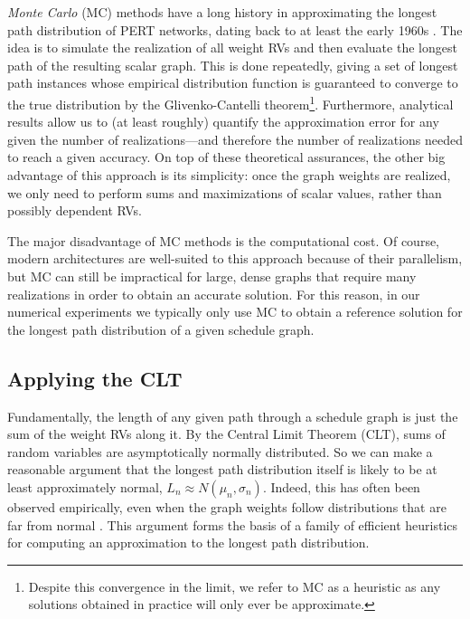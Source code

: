 \documentclass[12pt]{article}
\begin{document}
{\em Monte Carlo} (MC) methods have a long history in approximating the longest path distribution of PERT networks, dating back to at least the early 1960s \cite{van63}. The idea is to simulate the realization of all weight RVs and then evaluate the longest path of the resulting scalar graph. This is done repeatedly, giving a set of longest path instances whose empirical distribution function is guaranteed to converge to the true distribution by the Glivenko-Cantelli theorem\footnote{Despite this convergence in the limit, we refer to MC as a heuristic as any solutions obtained in practice will only ever be approximate.}. Furthermore, analytical results allow us to (at least roughly) quantify the approximation error for any given the number of realizations---and therefore the number of realizations needed to reach a given accuracy. On top of these theoretical assurances, the other big advantage of this approach is its simplicity: once the graph weights are realized, we only need to perform sums and maximizations of scalar values, rather than possibly dependent RVs.  

The major disadvantage of MC methods is the computational cost. Of course, modern architectures are well-suited to this approach because of their parallelism, but MC can still be impractical for large, dense graphs that require many realizations in order to obtain an accurate solution. For this reason, in our numerical experiments we typically only use MC to obtain a reference solution for the longest path distribution of a given schedule graph. 


\subsection{Applying the CLT}
\label{subsect.normality}

Fundamentally, the length of any given path through a schedule graph is just the sum of the weight RVs along it. By the Central Limit Theorem (CLT), sums of random variables are asymptotically normally distributed. So we can make a reasonable argument that the longest path distribution itself is likely to be at least approximately normal, $L_n \approx N(\mu_n, \sigma_n)$. Indeed, this has often been observed empirically, even when the graph weights follow distributions that are far from normal \cite{can10}. This argument forms the basis of a family of efficient heuristics for computing an approximation to the longest path distribution.
\end{document}
